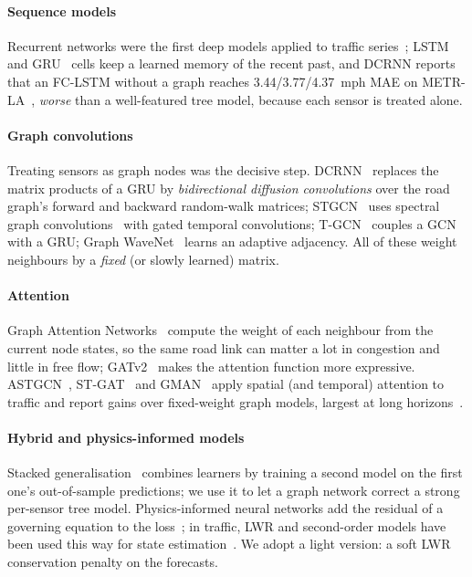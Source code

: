 \paragraph{Sequence models} Recurrent networks were the first deep models applied to traffic series~\cite{lv2015traffic}; LSTM~\cite{hochreiter1997lstm} and GRU~\cite{cho2014gru} cells keep a learned memory of the recent past, and DCRNN reports that an FC-LSTM without a graph reaches 3.44/3.77/4.37~mph MAE on METR-LA~\cite{li2018dcrnn}, \emph{worse} than a well-featured tree model, because each sensor is treated alone.

\paragraph{Graph convolutions} Treating sensors as graph nodes was the decisive step. DCRNN~\cite{li2018dcrnn} replaces the matrix products of a GRU by \emph{bidirectional diffusion convolutions} over the road graph's forward and backward random-walk matrices; STGCN~\cite{yu2018stgcn} uses spectral graph convolutions~\cite{kipf2017gcn} with gated temporal convolutions; T-GCN~\cite{zhao2019tgcn} couples a GCN with a GRU; Graph WaveNet~\cite{wu2019graphwavenet} learns an adaptive adjacency. All of these weight neighbours by a \emph{fixed} (or slowly learned) matrix.

\paragraph{Attention} Graph Attention Networks~\cite{velickovic2018gat} compute the weight of each neighbour from the current node states, so the same road link can matter a lot in congestion and little in free flow; GATv2~\cite{brody2022gatv2} makes the attention function more expressive. ASTGCN~\cite{guo2019astgcn}, ST-GAT~\cite{zhang2019stgat} and GMAN~\cite{shi2021masked} apply spatial (and temporal) attention to traffic and report gains over fixed-weight graph models, largest at long horizons~\cite{jiang2022survey}.

\paragraph{Hybrid and physics-informed models} Stacked generalisation~\cite{wolpert1992stacked} combines learners by training a second model on the first one's out-of-sample predictions; we use it to let a graph network correct a strong per-sensor tree model. Physics-informed neural networks add the residual of a governing equation to the loss~\cite{raissi2019pinn}; in traffic, LWR and second-order models have been used this way for state estimation~\cite{huang2020pidl,shi2020physics}. We adopt a light version: a soft LWR conservation penalty on the forecasts.

